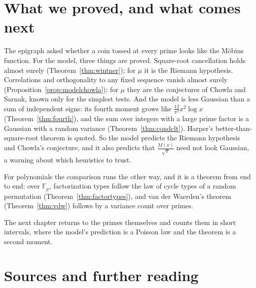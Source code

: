 \section{What we proved, and what comes next}

The epigraph asked whether a coin tossed at every prime looks like the M\"obius function. For the model, three things are proved. Square-root cancellation holds almost surely (Theorem~\ref{thm:wintner}); for $\mu$ it is the Riemann hypothesis. Correlations and orthogonality to any fixed sequence vanish almost surely (Proposition~\ref{prop:modelchowla}); for $\mu$ they are the conjectures of Chowla and Sarnak, known only for the simplest tests. And the model is less Gaussian than a sum of independent signs: its fourth moment grows like $\frac{12}{\pi^2}x^2\log x$ (Theorem~\ref{thm:fourth}), and the sum over integers with a large prime factor is a Gaussian with a random variance (Theorem~\ref{thm:condclt}). Harper's better-than-square-root theorem is quoted. So the model predicts the Riemann hypothesis and Chowla's conjecture, and it also predicts that $\frac{M(x)}{\sqrt x}$ need not look Gaussian, a warning about which heuristics to trust.

For polynomials the comparison runs the other way, and it is a theorem from end to end: over $\mathbb F_p$, factorization types follow the law of cycle types of a random permutation (Theorem~\ref{thm:factortypes}), and van der Waerden's theorem (Theorem~\ref{thm:vdw}) follows by a variance count over primes.

The next chapter returns to the primes themselves and counts them in short intervals, where the model's prediction is a Poisson law and the theorem is a second moment.

\section*{Sources and further reading}

